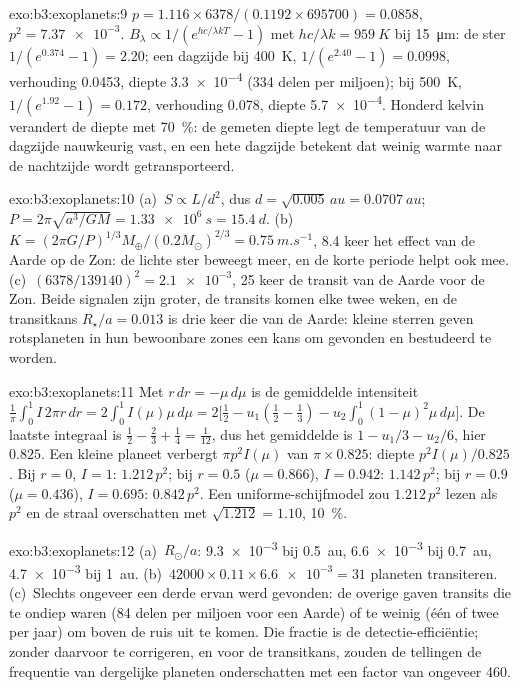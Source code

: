 \begin{solution}{exo:b3:exoplanets:9}
$p = 1.116\times6378/(0.1192\times695700) = 0.0858$, $p^2 = \num{7.37e-3}$.
$B_\lambda \propto 1/(e^{hc/\lambda kT} - 1)$ met $hc/\lambda k =
\qty{959}{K}$ bij \qty{15}{\micro m}: de ster $1/(e^{0.374} - 1) = 2.20$;
een dagzijde bij \qty{400}{K}, $1/(e^{2.40} - 1) = 0.0998$, verhouding \num{0.0453},
diepte \num{3.3e-4} (334 delen per miljoen); bij \qty{500}{K}, $1/(e^{1.92} -
1) = 0.172$, verhouding \num{0.078}, diepte \num{5.7e-4}. Honderd kelvin
verandert de diepte met \qty{70}{\percent}: de gemeten diepte legt de
temperatuur van de dagzijde nauwkeurig vast, en een hete dagzijde betekent dat weinig warmte
naar de nachtzijde wordt getransporteerd.
\end{solution}

\begin{solution}{exo:b3:exoplanets:10}
(a)~$S \propto L/d^2$, dus $d = \sqrt{0.005}\,\unit{au} = \qty{0.0707}{au}$;
$P = 2\pi\sqrt{a^3/GM} = \qty{1.33e6}{s} = \qty{15.4}{d}$.
(b)~$K = (2\pi G/P)^{1/3}M_\oplus/(0.2M_\odot)^{2/3} = \qty{0.75}{m.s^{-1}}$,
8.4 keer het effect van de Aarde op de Zon: de lichte ster beweegt meer, en
de korte periode helpt ook mee. (c)~$(6378/139140)^2 = \num{2.1e-3}$, 25 keer
de transit van de Aarde voor de Zon. Beide signalen zijn groter, de transits
komen elke twee weken, en de transitkans $R_\star/a =
\num{0.013}$ is drie keer die van de Aarde: kleine sterren geven rotsplaneten in
hun bewoonbare zones een kans om gevonden en bestudeerd te worden.
\end{solution}

\begin{solution}{exo:b3:exoplanets:11}
Met $r\,dr = -\mu\,d\mu$ is de gemiddelde intensiteit $\frac1\pi\int_0^1
I\,2\pi r\,dr = 2\int_0^1 I(\mu)\mu\,d\mu = 2\bigl[\tfrac12 - u_1(\tfrac12 -
\tfrac13) - u_2\int_0^1(1 - \mu)^2\mu\,d\mu\bigr]$. De laatste integraal is
$\tfrac12 - \tfrac23 + \tfrac14 = \tfrac1{12}$, dus het gemiddelde is $1 - u_1/3 -
u_2/6$, hier $0.825$. Een kleine planeet verbergt $\pi p^2 I(\mu)$ van $\pi\times
0.825$: diepte $p^2 I(\mu)/0.825$. Bij $r = 0$, $I = 1$: $1.212\,p^2$; bij
$r = 0.5$ ($\mu = 0.866$), $I = 0.942$: $1.142\,p^2$; bij $r = 0.9$ ($\mu =
0.436$), $I = 0.695$: $0.842\,p^2$. Een uniforme-schijfmodel zou
$1.212\,p^2$ lezen als $p^2$ en de straal overschatten met $\sqrt{1.212} = 1.10$,
\qty{10}{\percent}.
\end{solution}

\begin{solution}{exo:b3:exoplanets:12}
(a)~$R_\odot/a$: \num{9.3e-3} bij \qty{0.5}{au}, \num{6.6e-3} bij
\qty{0.7}{au}, \num{4.7e-3} bij \qty{1}{au}. (b)~$42000\times0.11\times
\num{6.6e-3} = 31$ planeten transiteren. (c)~Slechts ongeveer een derde ervan werd
gevonden: de overige gaven transits die te ondiep waren (84 delen per miljoen voor
een Aarde) of te weinig (één of twee per jaar) om boven de ruis uit te komen. Die
fractie is de detectie-efficiëntie; zonder daarvoor te corrigeren, en voor de
transitkans, zouden de tellingen de frequentie van dergelijke planeten onderschatten
met een factor van ongeveer 460.
\end{solution}

